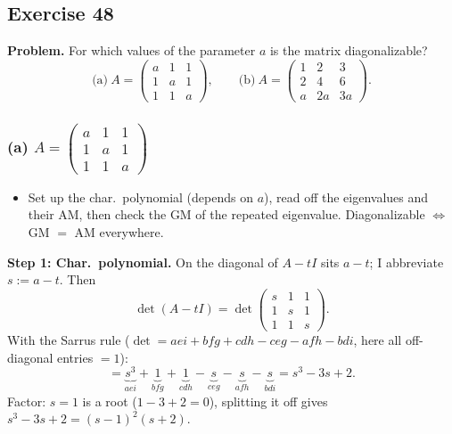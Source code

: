 \documentclass[a4paper,12pt]{article}
\begin{document}
\subsection*{Exercise 48}

\textbf{Problem.} For which values of the parameter $a$ is the matrix diagonalizable?
\[
\text{(a)}\ A = \begin{pmatrix} a & 1 & 1 \\ 1 & a & 1 \\ 1 & 1 & a \end{pmatrix}, \qquad
\text{(b)}\ A = \begin{pmatrix} 1 & 2 & 3 \\ 2 & 4 & 6 \\ a & 2a & 3a \end{pmatrix}.
\]

\subsubsection*{(a) $A = \left(\begin{smallmatrix} a & 1 & 1 \\ 1 & a & 1 \\ 1 & 1 & a \end{smallmatrix}\right)$}

\begin{wastun}
\begin{itemize}[leftmargin=*, nosep]
    \item Set up the char.\ polynomial (depends on $a$), read off the eigenvalues and their AM, then check the GM of the repeated eigenvalue. Diagonalizable $\Leftrightarrow$ GM $=$ AM everywhere.
\end{itemize}
\end{wastun}

\textbf{Step 1: Char.\ polynomial.} On the diagonal of $A - tI$ sits $a - t$; I abbreviate $s := a - t$. Then
\[
\det(A - tI) = \det\begin{pmatrix} s & 1 & 1 \\ 1 & s & 1 \\ 1 & 1 & s \end{pmatrix}.
\]
With the Sarrus rule ($\det = aei + bfg + cdh - ceg - afh - bdi$, here all off-diagonal entries $= 1$):
\[
= \underbrace{s^3}_{aei} + \underbrace{1}_{bfg} + \underbrace{1}_{cdh} - \underbrace{s}_{ceg} - \underbrace{s}_{afh} - \underbrace{s}_{bdi} = s^3 - 3s + 2.
\]
Factor: $s = 1$ is a root ($1 - 3 + 2 = 0$), splitting it off gives $s^3 - 3s + 2 = (s-1)^2(s+2)$.
\end{document}

